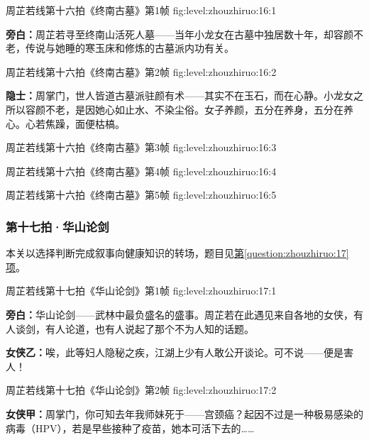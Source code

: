   {周芷若线第十六拍《终南古墓》第1帧}
  {fig:level:zhouzhiruo:16:1}
  {\scriptsize}
  {\textbf{旁白：}周芷若寻至终南山活死人墓——当年小龙女在古墓中独居数十年，却容颜不老，传说与她睡的寒玉床和修炼的古墓派内功有关。\par}

  {周芷若线第十六拍《终南古墓》第2帧}
  {fig:level:zhouzhiruo:16:2}
  {\scriptsize}
  {\textbf{隐士：}周掌门，世人皆道古墓派驻颜有术——其实不在玉石，而在心静。小龙女之所以容颜不老，是因她心如止水、不染尘俗。女子养颜，五分在养身，五分在养心。心若焦躁，面便枯槁。\par}

  {周芷若线第十六拍《终南古墓》第3帧}
  {fig:level:zhouzhiruo:16:3}
  {\scriptsize}
  {\mbox{}}

\clearpage

  {周芷若线第十六拍《终南古墓》第4帧}
  {fig:level:zhouzhiruo:16:4}
  {\scriptsize}
  {\mbox{}}

  {周芷若线第十六拍《终南古墓》第5帧}
  {fig:level:zhouzhiruo:16:5}
  {\scriptsize}
  {\mbox{}}

\subsubsection{第十七拍·华山论剑}\label{plot:zhouzhiruo:17}
本关以选择判断完成叙事向健康知识的转场，题目见\hyperref[question:zhouzhiruo:17]{第\ref*{question:zhouzhiruo:17}项}。

  {周芷若线第十七拍《华山论剑》第1帧}
  {fig:level:zhouzhiruo:17:1}
  {\scriptsize}
  {\textbf{旁白：}华山论剑——武林中最负盛名的盛事。周芷若在此遇见来自各地的女侠，有人谈剑，有人论道，也有人说起了那个不为人知的话题。\par
\textbf{女侠乙：}唉，此等妇人隐秘之疾，江湖上少有人敢公开谈论。可不说——便是害人！\par}

\clearpage

  {周芷若线第十七拍《华山论剑》第2帧}
  {fig:level:zhouzhiruo:17:2}
  {\scriptsize}
  {\textbf{女侠甲：}周掌门，你可知去年我师妹死于——宫颈癌？起因不过是一种极易感染的病毒（HPV），若是早些接种了疫苗，她本可活下去的……\par}

